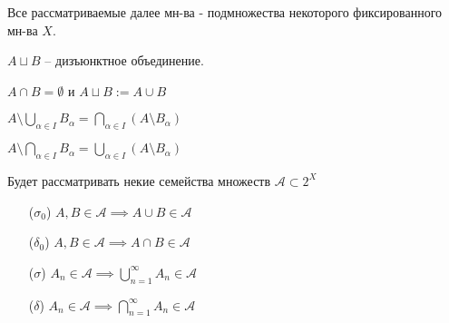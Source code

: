 
Все рассматриваемые далее мн-ва - подмножества некоторого фиксированного мн-ва $X$.

\begin{definition}[Обозначение]\thmslashn
	
	$A \sqcup B$ -- дизъюнктное объединение.
	
	$A\cap B = \emptyset$ и $A\sqcup B := A\cup B$
\end{definition}

\begin{remark}[-- напоминание]\thmslashn
	
	$A\setminus \bigcup\limits_{\alpha \in I} B_{\alpha} = \bigcap\limits_{\alpha \in I} (A\setminus B_{\alpha})$
	
	$A\setminus \bigcap\limits_{\alpha \in I} B_{\alpha} = \bigcup\limits_{\alpha \in I} (A\setminus B_{\alpha})$

\end{remark}

\begin{definition}\thmslashn

	Будет рассматривать некие семейства множеств $\mathcal{A} \subset 2^X$

\end{definition}

\begin{properties}\thmslashn
	
	\begin{itemize}
		
		\item[($\sigma_0$)] $A,B \in \mathcal{A} \implies A\cup B \in \mathcal{A}$
		
		\item[($\delta_0$)] $A,B \in \mathcal{A} \implies A\cap B \in \mathcal{A}$
		
		\item[($\sigma$)] $A_n \in \mathcal{A} \implies \bigcup\limits_{n=1}^{\infty} A_n \in \mathcal{A}$
		
		\item[($\delta$)] $A_n \in \mathcal{A} \implies \bigcap\limits_{n=1}^{\infty} A_n \in \mathcal{A}$
	\end{itemize}
\end{properties}

